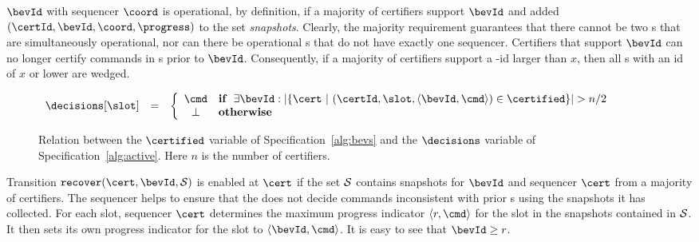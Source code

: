 {\Round} $\bevId$ with sequencer $\coord$ is operational,
by definition, if a majority of certifiers support $\bevId$ and added
$(\certId, \bevId, \coord, \progress)$ to the set \textit{snapshots}.
Clearly, the majority requirement guarantees that there cannot be two
{\round}s that are simultaneously operational, nor can there be operational
{\round}s that do not have exactly one sequencer.
Certifiers that support $\bevId$ can no longer certify commands
in {\round}s prior to $\bevId$.
Consequently, if a majority of certifiers support a {\round}-id
larger than $x$, then all {\round}s with an id of $x$ or lower
are wedged.

\begin{figure*}
\begin{center}
\begin{math}
\begin{array}{rcl}
{\decisions[\slot]} & = & {\left\{
	\begin{array}{cl}
		\cmd & {\textbf{if}~~ \exists \bevId:
			| \lbrace \cert ~|~ (\certId, \slot, \langle \bevId, \cmd \rangle) \in \certified \rbrace | > n/2} \\
		\bot & \textbf{otherwise}
	\end{array}
\right.}
\end{array}
\end{math}
\end{center}

\caption{\label{fig:refine} {\small Relation between the $\certified$
variable of Specification~\ref{alg:bevs} and the
$\decisions$ variable of Specification~\ref{alg:active}.
Here $n$ is the number of certifiers.}}

\end{figure*}

\begin{comment}
With \multiconsensus, the coordinator
of a {\round} is also its sequencer.  We shall see that this is not the case with VSR (Section~\ref{sec:implementation}).
\end{comment}


Transition $\texttt{recover}(\cert, \bevId, {\cal S})$
is enabled at $\cert$ if
the set $\cal S$ contains snapshots for $\bevId$ and sequencer $\cert$
from a majority of certifiers.
The sequencer
helps to ensure that the {\round} does not
decide commands inconsistent with prior {\round}s using the snapshots
it has collected.
For each slot, sequencer $\cert$ determines the maximum
progress indicator $\langle r, \cmd \rangle$ for the slot in the
snapshots contained in $\cal S$.  It then sets its own progress
indicator for the slot to $\langle \bevId, \cmd \rangle$.
It is easy to see that $\bevId \geq r$.

